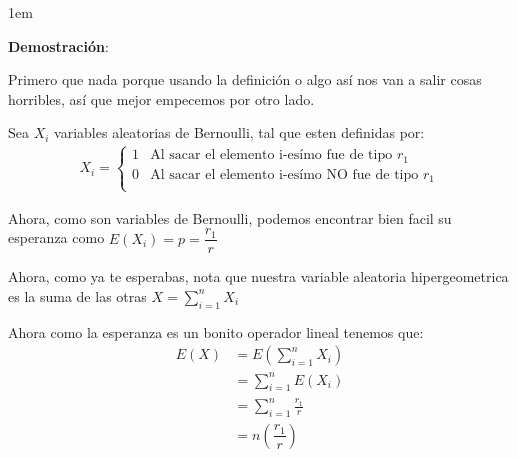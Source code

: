 \documentclass[12pt, fleqn]{report}                             %
\newenvironment{SmallIndentation}[1][0.75em]                    %
        {\begin{adjustwidth}{#1}{}\begin{footnotesize}}             %
        {\end{footnotesize}\end{adjustwidth}}                       %
\theoremstyle{break}                                            %
\newcommand{\Wrap}[1]           {\left( #1 \right)}             %
\newcommand{\pfrac}[2]      {\Wrap{\dfrac{#1}{#2}}}             %
\begin{document}
                \begin{SmallIndentation}[1em]
                    \textbf{Demostración}:
                    
                    Primero que nada porque usando la definición o algo así nos van a
                    salir cosas horribles, así que mejor empecemos por otro lado.

                    Sea $X_i$ variables aleatorias de Bernoulli, tal que esten
                    definidas por: 
                    \begin{align*}
                        X_i = 
                            \begin{cases}
                                1 & \text{Al sacar el elemento i-esímo fue de tipo $r_1$}        \\
                                0 & \text{Al sacar el elemento i-esímo NO fue de tipo $r_1$}     \\
                            \end{cases}
                    \end{align*}

                    Ahora, como son variables de Bernoulli, podemos encontrar bien facil
                    su esperanza como $E(X_i) = p = \dfrac{r_1}{r}$

                    Ahora, como ya te esperabas, nota que nuestra variable aleatoria hipergeometrica
                    es la suma de las otras $X = \sum_{i = 1}^n X_i$

                    Ahora como la esperanza es un bonito operador lineal tenemos que:
                    \begin{align*}
                        E(X)
                            &= E \Wrap{\sum_{i = 1}^n X_i}      \\
                            &= \sum_{i = 1}^n E(X_i)            \\
                            &= \sum_{i = 1}^n \frac{r_1}{r}     \\
                            &= n \pfrac{r_1}{r}   
                    \end{align*}
                    
                \end{SmallIndentation}

\end{document}
